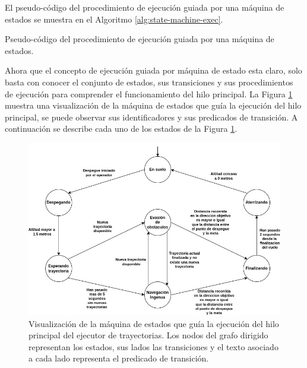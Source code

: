 El pseudo-código del procedimiento de ejecución guiada por una máquina de estados se muestra en el Algoritmo \ref{alg:state-machine-exec}.

\begin{algorithm}
\caption{Pseudo-código del procedimiento de ejecución guiada por una máquina de estados. }
\label{alg:state-machine-exec}


\end{algorithm}

Ahora que el concepto de ejecución guiada por máquina de estado esta claro, solo basta con conocer el conjunto de estados, sus transiciones y sus procedimientos de ejecución para comprender el funcionamiento del hilo principal. La Figura \ref{fig:state-machine} muestra una visualización de la máquina de estados que guía la ejecución del hilo principal, se puede observar sus identificadores y sus predicados de transición. A continuación se describe cada uno de los estados de la Figura \ref{fig:state-machine}. 

\begin{figure}[H]
    \centering
    \includegraphics[scale=0.54]{partes/img/State Machine.jpg}
    \caption[Visualización de la máquina de estados que guía la ejecución del hilo principal del ejecutor de trayectorias.]{Visualización de la máquina de estados que guía la ejecución del hilo principal del ejecutor de trayectorias. Los nodos del grafo dirigido representan los estados, sus lados las transiciones y el texto asociado a cada lado representa el predicado de transición.}
    \label{fig:state-machine}
\end{figure}

